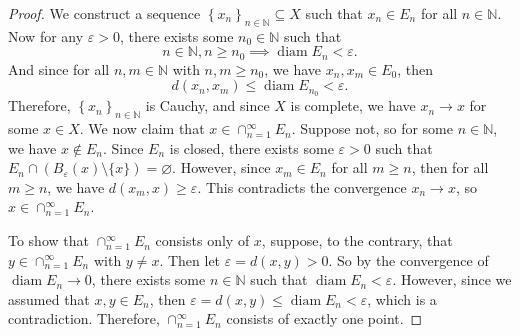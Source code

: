\documentclass[12pt]{article}
\newcommand{\seq}[2][n]{\left\{#2\right\}_{#1\in\N}}
\newcommand{\<}{\left\langle}
\renewcommand{\>}{\right\rangle}
\newcommand{\N}{\mathbb{N}}
\let\eps\varepsilon
\let\emptyset\varnothing
\begin{document}
\begin{proof}
    We construct a sequence $\seq{x_n}\subseteq X$ such that $x_n\in E_n$ for all $n\in\N$. Now for any $\eps>0$, there exists some $n_0\in\N$ such that
    \[n\in\N, n\geq n_0 \implies \operatorname{diam} E_n < \eps.\]
    And since for all $n,m\in\N$ with $n,m\geq n_0$, we have $x_n,x_m \in E_0$, then
    \[d(x_n,x_m) \leq \operatorname{diam}E_{n_0} < \eps.\]
    Therefore, $\seq{x_n}$ is Cauchy, and since $X$ is complete, we have $x_n\to x$ for some $x\in X$. We now claim that $x\in\cap_{n=1}^\infty E_n$. Suppose not, so for some $n\in\N$, we have $x\notin E_n$. Since $E_n$ is closed, there exists some $\eps>0$ such that $E_n\cap(B_\eps(x)\setminus\{x\}) = \emptyset$. However, since $x_m\in E_n$ for all $m\geq n$, then for all $m\geq n$, we have $d(x_m, x) \geq \eps$. This contradicts the convergence $x_n\to x$, so $x\in\cap_{n=1}^\infty E_n$.
    
    To show that $\cap_{n=1}^\infty E_n$ consists only of $x$, suppose, to the contrary, that $y\in\cap_{n=1}^\infty E_n$ with $y\ne x$. Then let $\eps = d(x,y) > 0$. So by the convergence of $\operatorname{diam} E_n\to 0$, there exists some $n\in\N$ such that $\operatorname{diam}E_n<\eps$. However, since we assumed that $x,y\in E_n$, then $\eps = d(x,y) \leq \operatorname{diam}E_n < \eps$, which is a contradiction. Therefore, $\cap_{n=1}^\infty E_n$ consists of exactly one point.

\end{proof}
\end{document}
